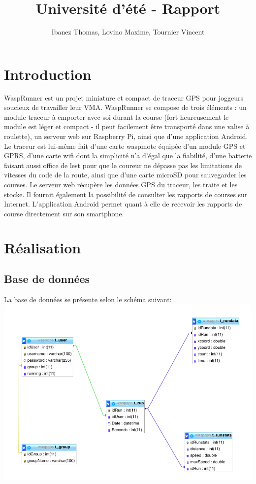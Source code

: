 \documentclass[a4paper,11pt]{article}
\title{Université d'été - Rapport}
\author{Ibanez Thomas, Lovino Maxime, Tournier Vincent}
\begin{document}
\maketitle
\section{Introduction}
WaspRunner est un projet miniature et compact de traceur GPS pour joggeurs soucieux de travailler leur VMA.\newline
WaspRunner se compose de trois éléments : un module traceur à emporter avec soi durant la course (fort heureusement le module est léger et compact - il peut facilement être transporté dans une valise à roulette), un serveur web sur Raspberry Pi, ainsi que d'une application Android.\newline
Le traceur est lui-même fait d'une carte waspmote équipée d'un module GPS et GPRS, d'une carte wifi dont la simplicité n'a d'égal que la fiabilité, d'une batterie faisant aussi office de lest pour que le coureur ne dépasse pas les limitations de vitesses du code de la route, ainsi que d'une carte microSD pour sauvegarder les courses.\newline
Le serveur web récupère les données GPS du traceur, les traite et les stocke. Il fournit également la possibilité de consulter les rapports de courses sur Internet.\newline
L'application Android permet quant à elle de recevoir les rapports de course directement sur son smartphone.\newline
\section{Réalisation}
\subsection{Base de données}
La base de données se présente selon le schéma suivant: \newline
\includegraphics[scale=0.4]{db.png}
\end{document}
